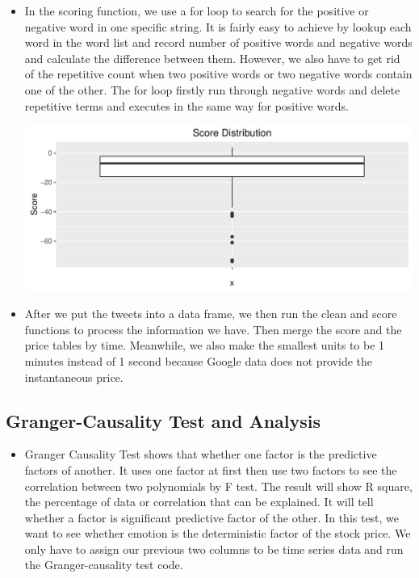 \documentclass[a0,landscape]{a0poster}\usepackage[]{graphicx}\usepackage[]{color}
\makeatletter
\def\maxwidth{ %
  \ifdim\Gin@nat@width>\linewidth
    \linewidth
  \else
    \Gin@nat@width
  \fi
}
\newenvironment{knitrout}{}{} %
\makeatother
\begin{document}
\begin{multicols}{4}
\begin{itemize}
\item In the scoring function, we use a for loop to search for the positive or negative word in one specific string. It is fairly easy to achieve by lookup each word in the word list and record number of positive words and negative words and calculate the difference between them. However, we also have to get rid of the repetitive count when two positive words or two negative words contain one of the other. The for loop firstly run through negative words and delete repetitive terms and executes in the same way for positive words. 

\begin{center}

\begin{knitrout}
\color{fgcolor}
\includegraphics[width=\maxwidth]{figure/myplot-1} 

\end{knitrout}

\end{center}


\item After we put the tweets into a data frame, we then run the clean and score functions to process the information we have. Then merge the score and the price tables by time. Meanwhile, we also make the smallest units to be 1 minutes instead of 1 second because Google data does not provide the instantaneous price. 

\end{itemize}

\subsection*{ Granger-Causality Test and Analysis}

\begin{itemize}

\item Granger Causality Test shows that whether one factor is the predictive factors of another. It uses one factor at first then use two factors to see the correlation between two polynomials by F test. The result will show R square, the percentage of data or correlation that can be explained. It will tell whether a factor is significant predictive factor of the other. In this test, we want to see whether emotion is the deterministic factor of the stock price. We only have to assign our previous two columns to be time series data and run the Granger-causality test code. 
\\


\end{itemize}
\end{multicols}
\end{document}

